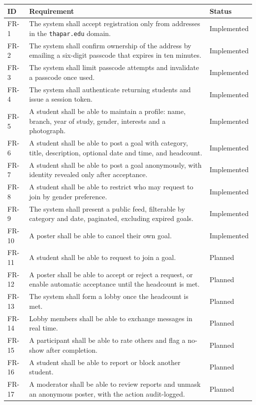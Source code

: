 \documentclass[twoside,12pt]{tietreport}
\begin{document}
\begin{longtable}{@{}p{1.4cm}p{8.2cm}p{3.2cm}@{}}
\toprule
\textbf{ID} & \textbf{Requirement} & \textbf{Status} \\
\midrule
\endhead
FR-1 & The system shall accept registration only from addresses in the
        \texttt{thapar.edu} domain. & Implemented \\
FR-2 & The system shall confirm ownership of the address by emailing a six-digit
        passcode that expires in ten minutes. & Implemented \\
FR-3 & The system shall limit passcode attempts and invalidate a passcode once
        used. & Implemented \\
FR-4 & The system shall authenticate returning students and issue a session
        token. & Implemented \\
FR-5 & A student shall be able to maintain a profile: name, branch, year of
        study, gender, interests and a photograph. & Implemented \\
FR-6 & A student shall be able to post a goal with category, title, description,
        optional date and time, and headcount. & Implemented \\
FR-7 & A student shall be able to post a goal anonymously, with identity revealed
        only after acceptance. & Implemented \\
FR-8 & A student shall be able to restrict who may request to join by gender
        preference. & Implemented \\
FR-9 & The system shall present a public feed, filterable by category and date,
        paginated, excluding expired goals. & Implemented \\
FR-10 & A poster shall be able to cancel their own goal. & Implemented \\
FR-11 & A student shall be able to request to join a goal. & Planned \\
FR-12 & A poster shall be able to accept or reject a request, or enable automatic
        acceptance until the headcount is met. & Planned \\
FR-13 & The system shall form a lobby once the headcount is met. & Planned \\
FR-14 & Lobby members shall be able to exchange messages in real time. & Planned \\
FR-15 & A participant shall be able to rate others and flag a no-show after
        completion. & Planned \\
FR-16 & A student shall be able to report or block another student. & Planned \\
FR-17 & A moderator shall be able to review reports and unmask an anonymous
        poster, with the action audit-logged. & Planned \\
\bottomrule
\end{longtable}
\end{document}
